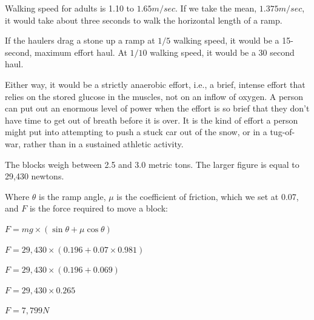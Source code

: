 \documentclass[letterpaper,11pt]{article}
\begin{document}
Walking speed for adults is 1.10 to $1.65 m/sec$. 
If we take the mean, $1.375 m/sec$, it would take about three seconds to walk the horizontal length of a ramp.  

If the haulers drag a stone up a ramp at $1/5$ walking speed, it would be a 15-second, maximum effort haul. 
At $1/10$ walking speed, it would be a 30 second haul.  

Either way, it would be a strictly anaerobic effort, i.e., a brief, intense effort that relies on the stored glucose in the muscles, 
not on an inflow of oxygen. 
A person can put out an enormous level of power when the effort is so brief that they don't have time to get out of breath before it is over. 
It is the kind of effort a person might put into attempting to push a stuck car out of the snow, or in a tug-of-war, 
rather than in a sustained athletic activity. 

The blocks weigh between 2.5 and 3.0 metric tons. The larger figure is equal to 29,430 newtons. 

Where $\theta$ is the ramp angle, $\mu$ is the coefficient of friction, which we set at 0.07, and $F$ is the force required to move a block:

\vspace{10pt}

$	F = mg \times (\sin \theta + \mu \cos \theta) $ 

$	F = 29,430 \times (0.196 + 0.07 \times 0.981)$ 

$	F = 29,430 \times (0.196 + 0.069)$ 

$	F = 29,430 \times 0.265$ 

$	F = 7,799 N $
\vspace{10pt}
\end{document}
